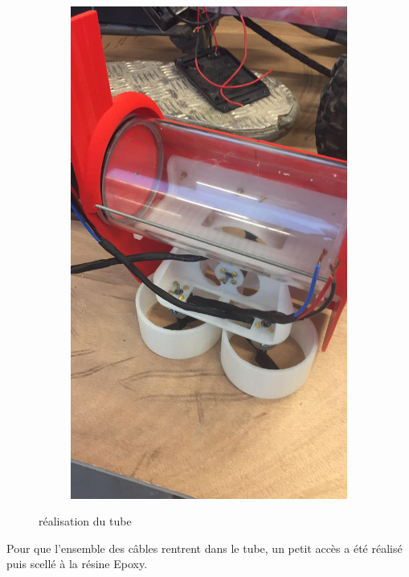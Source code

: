 \documentclass[a4paper,11pt]{report}
\begin{document}
\begin{figure}[!h]
\begin{subfigure}[b]{0.3\textwidth}
							\end{subfigure}
							\begin{subfigure}[b]{0.3\textwidth}
								\includegraphics[width=\textwidth]{Photos/Capture8.jpeg}
							\end{subfigure}
							\caption{réalisation du tube}
					\end{figure}
					
		Pour que l'ensemble des câbles rentrent dans le tube, un petit accès a été réalisé puis scellé à la résine Epoxy.
		
\end{document}
